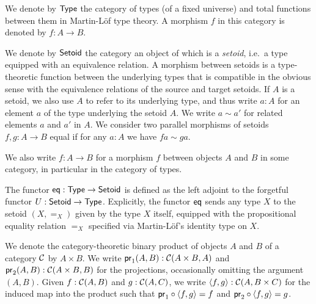 \documentclass[envcountsame]{llncs}
\begin{document}
% 

\begin{definition}\label{def:set_setoid}
 We denote by $\Set$ the category of types (of a fixed universe) and total functions between them in Martin-L\"of type theory. 
 A morphism $f$ in this category is denoted by $f : A \to B$.
 
 We denote by $\Setoid$ the category an object of which is a \emph{setoid}, i.e.\ a type equipped with an equivalence relation.
 A morphism between setoids is a type-theoretic function between the underlying types that is compatible in the obvious sense with the equivalence relations of the source and target setoids.
 If $A$ is a setoid, we also use $A$ to refer to its underlying type, and thus write $a:A$ for an element $a$ of the type underlying the setoid $A$. 
 We write $a\sim a'$ for related elements $a$ and $a'$ in $A$.
 We consider two parallel morphisms of setoids $f,g:A\to B$ equal if for any $a:A$ we have $fa \sim ga$.
 
 We also write $f:A\to B$ for a morphism $f$ between objects $A$ and $B$ in some category, in particular in the category of types.
 \end{definition}



\begin{definition}\label{def:eq}
 The functor $\eq : \Set\to\Setoid$ is defined as the left adjoint to the forgetful functor $U : \Setoid \to \Set$.
  Explicitly, the functor $\eq$ sends any type $X$ to the setoid $(X,=_X)$ given by the type $X$ itself, equipped
  with the propositional equality relation $=_X$ specified via Martin-L\"of's identity type on $X$.
\end{definition}


\begin{remark}
  We denote the category-theoretic binary product of objects $A$ and $B$ of a category $\C$ by $A\times B$.
  We write $\pr_1(A,B) : \C(A\times B, A)$ and $\pr_2(A,B) :\C(A\times B, B)$ for the projections, occasionally omitting the 
  argument $(A,B)$.
  Given $f : \C(A, B)$ and $g : \C(A,C)$, we write $\langle f,g\rangle : \C(A,B\times C)$ for the induced map into the product such that
  $\comp{\langle f,g\rangle}{\pr_1} = f$ and $\comp{\langle f,g\rangle}{\pr_2} = g$.
\end{remark}
\end{document}
